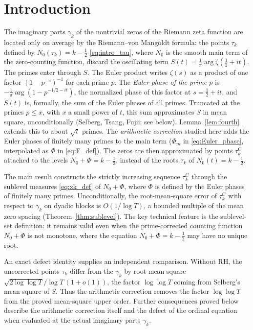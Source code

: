 \documentclass[11pt,a4paper]{article}
\makeatletter
\numberwithin{equation}{section}
\DeclareRobustCommand{\CGref}[1]{\ref{#1}}
\DeclareRobustCommand{\CGeqref}[1]{\eqref{#1}}
\let\CG@origref\ref
\let\CG@origeqref\eqref
\newcommand{\CG@gettip}[1]{\@ifundefined{CGTip@#1}{#1}{\csname CGTip@#1\endcsname}}
\DeclareRobustCommand{\CGref}[1]{\pdftooltip{\CG@origref{#1}}{\CG@gettip{#1}}}
\DeclareRobustCommand{\CGeqref}[1]{\pdftooltip{\CG@origeqref{#1}}{\CG@gettip{#1}}}
\theoremstyle{definition}
\theoremstyle{remark}
\newcommand{\Nz}{N_0} %
\newcommand{\Ph}{\Phi}
\makeatother
\begin{document}
\section{Introduction}\label{sec:intro}
The imaginary parts $\gamma_k$ of the nontrivial zeros of the Riemann zeta function are located only on average by the Riemann--von Mangoldt formula: the points $\tau_k$ defined by $\Nz(\tau_k)=k-\frac12$ \CGeqref{eq:intro_tau}, where $\Nz$ is the smooth main term of the zero-counting function, discard the oscillating term $S(t)=\frac1\pi\arg\zeta(\frac12+it)$. The primes enter through $S$. The Euler product writes $\zeta(s)$ as a product of one factor $(1-p^{-s})^{-1}$ for each prime $p$. The \emph{Euler phase of the prime $p$} is $-\frac1\pi\arg(1-p^{-1/2-it})$, the normalized phase of this factor at $s=\frac12+it$, and $S(t)$ is, formally, the sum of the Euler phases of all primes. Truncated at the primes $p\le x$, with $x$ a small power of $t$, this sum approximates $S$ in mean square, unconditionally (Selberg, Tsang, Fujii; see below). Lemma~\CGref{lem:fourth} extends this to about $\sqrt t$ primes. The \emph{arithmetic correction} studied here adds the Euler phases of finitely many primes to the main term ($\Ph_m$ in \CGeqref{eq:Euler_phase}, interpolated as $\Ph$ in \CGeqref{eq:F_def}). The zeros are then approximated by points $\tau_k^{\mathrm C}$ attached to the levels $\Nz+\Ph=k-\frac12$, instead of the roots $\tau_k$ of $\Nz(t)=k-\frac12$.

The main result constructs the strictly increasing sequence $\tau_k^{\mathrm C}$ through the sublevel measures \CGeqref{eq:xk_def} of $\Nz+\Ph$, where $\Ph$ is defined by the Euler phases of finitely many primes. Unconditionally, the root-mean-square error of $\tau_k^{\mathrm C}$ with respect to $\gamma_k$ on dyadic blocks is $O(1/\log T)$, a bounded multiple of the mean zero spacing (Theorem~\CGref{thm:sublevel}). The key technical feature is the sublevel-set definition: it remains valid even when the prime-corrected counting function $\Nz+\Ph$ is not monotone, where the equation $\Nz+\Ph=k-\frac12$ may have no unique root.

An exact defect identity supplies an independent comparison. Without RH, the uncorrected points $\tau_k$ differ from the $\gamma_k$ by root-mean-square $\sqrt{2\log\log T}/\log T\,(1+o(1))$, the factor $\log\log T$ coming from Selberg's mean square of $S$. Thus the arithmetic correction removes the factor $\log\log T$ from the proved mean-square upper order. Further consequences proved below describe the arithmetic correction itself and the defect of the ordinal equation when evaluated at the actual imaginary parts $\gamma_k$.
\end{document}

